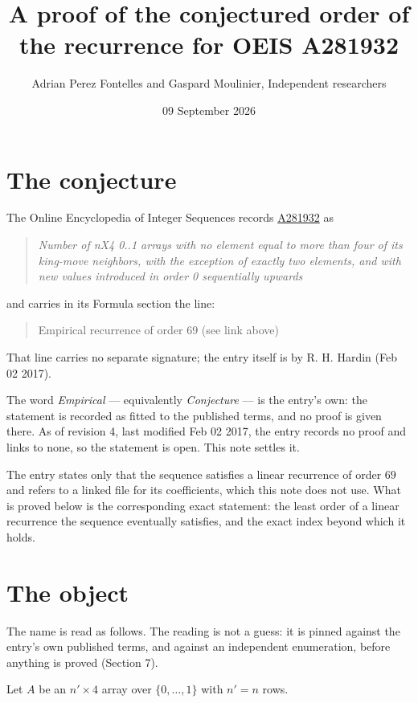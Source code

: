 \documentclass[11pt]{article}
\title{A proof of the conjectured order of the recurrence for OEIS A281932}
\author{Adrian Perez Fontelles and Gaspard Moulinier, Independent researchers}
\date{09 September 2026}
\theoremstyle{definition}
\begin{document}
\maketitle
\section{The conjecture}

The Online Encyclopedia of Integer Sequences records \href{https://oeis.org/A281932}{A281932} as

\begin{quote}\itshape Number of nX4 0..1 arrays with no element equal to more than four of its king-move neighbors, with the exception of exactly two elements, and with new values introduced in order 0 sequentially upwards\end{quote}

and carries in its Formula section the line:

\begin{quote}\ttfamily Empirical recurrence of order 69 (see link above)\end{quote}

That line carries no separate signature; the entry itself is by R. H. Hardin (Feb 02 2017).

The word {\itshape Empirical} --- equivalently {\itshape Conjecture} --- is the entry's own: the statement is recorded as fitted to the published terms, and no proof is given there. As of revision 4, last modified Feb 02 2017, the entry records no proof and links to none, so the statement is open. This note settles it.

The entry states only that the sequence satisfies a linear recurrence of order $69$ and refers to a linked file for its coefficients, which this note does not use. What is proved below is the corresponding exact statement: the least order of a linear recurrence the sequence eventually satisfies, and the exact index beyond which it holds.

\section{The object}

The name is read as follows. The reading is not a guess: it is pinned against the entry's own published terms, and against an independent enumeration, before anything is proved (Section 7).

Let $A$ be an $n' \times 4$ array over $\{0,\dots,1\}$ with $n' = n$ rows.
\end{document}
